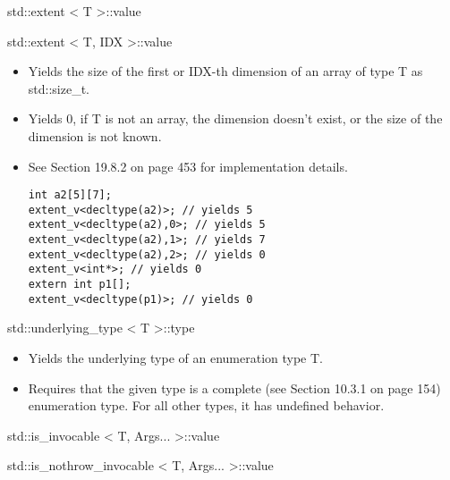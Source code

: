 std::extent < T >::value

std::extent < T, IDX >::value

\begin{itemize}
\item 
Yields the size of the first or IDX-th dimension of an array of type T as std::size\_t.

\item 
Yields 0, if T is not an array, the dimension doesn’t exist, or the size of the dimension is not known.

\item 
See Section 19.8.2 on page 453 for implementation details.
\begin{lstlisting}[style=styleCXX]
int a2[5][7];
extent_v<decltype(a2)>; // yields 5
extent_v<decltype(a2),0>; // yields 5
extent_v<decltype(a2),1>; // yields 7
extent_v<decltype(a2),2>; // yields 0
extent_v<int*>; // yields 0
extern int p1[];
extent_v<decltype(p1)>; // yields 0
\end{lstlisting}
\end{itemize}

std::underlying\_type < T >::type

\begin{itemize}
\item 
Yields the underlying type of an enumeration type T.

\item 
Requires that the given type is a complete (see Section 10.3.1 on page 154) enumeration type. For all other types, it has undefined behavior.
\end{itemize}

std::is\_invocable < T, Args... >::value

std::is\_nothrow\_invocable < T, Args... >::value

